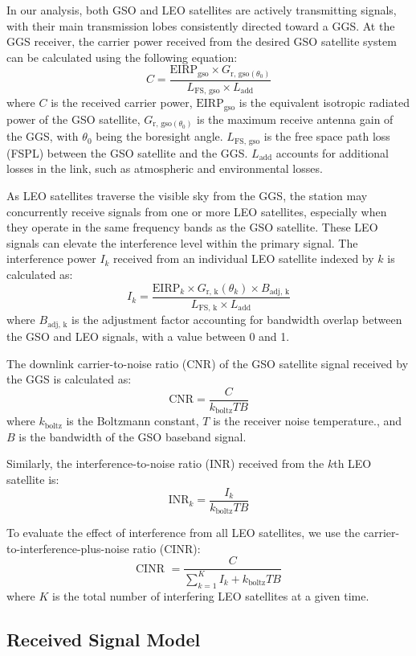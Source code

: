 \documentclass[12pt]{article}
\begin{document}
In our analysis, both GSO and LEO satellites are actively transmitting signals, with their main transmission lobes consistently directed toward a GGS. At the GGS receiver, the carrier power received from the desired GSO satellite system can be calculated using the following equation:
$$
C = \frac{\text{EIRP}_{\text{gso}} \times G_{\text{r, gso}(\theta_0)}}{L_{\text{FS, gso}} \times  L_{\text{add}}}
$$
where $C $ is the received carrier power, $\text{EIRP}_{\text{gso}}$ is the equivalent isotropic radiated power of the GSO satellite, $G_{\text{r, gso}(\theta_0)}$ is the maximum receive antenna gain of the GGS, with $\theta_0$ being the boresight angle. $L_{\text{FS, gso}}$ is the free space path loss (FSPL) between the GSO satellite and the GGS. $L_{\text{add}}$ accounts for additional losses in the link, such as atmospheric and environmental losses.

As LEO satellites traverse the visible sky from the GGS, the station may concurrently receive signals from one or more LEO satellites, especially when they operate in the same frequency bands as the GSO satellite. These LEO signals can elevate the interference level within the primary signal. The interference power $I_k$ received from an individual LEO satellite indexed by $k$ is calculated as:
$$
I_k = \frac{\text{EIRP}_{k} \times G_{\text{r, k}}(\theta_k) \times B_{\text{adj, k}}}{L_{\text{FS, k} }\times  L_{\text{add}}}
$$
where $B_{\text{adj, k}}$ is the adjustment factor accounting for bandwidth overlap between the GSO and LEO signals, with a value between 0 and 1.

The downlink carrier-to-noise ratio (CNR) of the GSO satellite signal received by the GGS is calculated as:
$$
\text{CNR} = \frac{C }{k_{\text{boltz}}TB}
$$
where $k_{\text{boltz}}$ is the Boltzmann constant, $T$ is the receiver noise temperature., and $B$ is the bandwidth of the GSO baseband signal.

Similarly,  the interference-to-noise ratio (INR) received from the $k$th LEO satellite is:
$$
\text{INR}_k = \frac{I_k }{k_{\text{boltz}}TB}
$$

To evaluate the effect of interference from all LEO satellites, we use the carrier-to-interference-plus-noise ratio (CINR):
$$
\text{CINR } = \frac{C }{\sum_{k=1}^{K }I_k + k_{\text{boltz}}TB}
$$
where $K$ is the total number of interfering LEO satellites at a given time.

\subsection{Received Signal Model}
\end{document}
